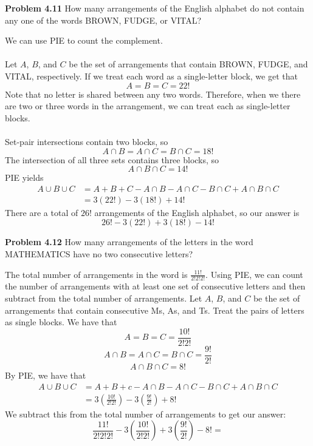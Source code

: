 \documentclass[11pt]{scrartcl}
\begin{document}
\noindent 
\begin{tcolorbox}
\textbf{Problem 4.11} How many arrangements of the English alphabet do not contain any one of the words BROWN, FUDGE, or VITAL?
\end{tcolorbox}
\noindent 
We can use PIE to count the complement. \\
\\
\noindent
Let $A$, $B$, and $C$ be the set of arrangements that contain BROWN, FUDGE, and VITAL, respectively. If we treat each word as a single-letter block, we get that 
$$A=B=C=22!$$
\noindent 
Note that no letter is shared between any two words. Therefore, when we there are two or three words in the arrangement, we can treat each as single-letter blocks. \\
\\
\noindent
Set-pair intersections contain two blocks, so 
$${A \cap B}={A \cap C}={B \cap C}=18!$$
The intersection of all three sets contains three blocks, so
$${A \cap B \cap C}=14!$$
\noindent 
PIE yields 
\begin{align*}
    {A \cup B \cup C} &={A}+{B}+{C}-{A \cap B}-{A \cap C}-{B \cap C}+{A \cap B \cap C} \\
                      &=3(22!)-3(18!)+14!
\end{align*}
\noindent 
There are a total of $26!$ arrangements of the English alphabet, so our answer is 
$$26!-3(22!)+3(18!)-14!$$
\begin{tcolorbox}
\textbf{Problem 4.12} How many arrangements of the letters in the word MATHEMATICS have no two consecutive letters? 
\end{tcolorbox}
\noindent 
The total number of arrangements in the word is $\frac{11!}{2!2!2!}$. Using PIE, we can count the number of arrangements with at least one set of consecutive letters and then subtract from the total number of arrangements. Let $A$, $B$, and $C$ be the set of arrangements that contain consecutive Ms, As, and Ts. Treat the pairs of letters as single blocks. We have that 
$$A=B=C=\frac{10!}{2!2!}$$
$${A \cap B}={A \cap C}={B \cap C}={\frac{9!}{2!}}$$
$${A \cap B \cap C}=8!$$
By PIE, we have that 
\begin{align*}
    {A \cup B \cup C} &={A}+{B}+{c}-{A \cap B}-{A \cap C}-{B \cap C}+{A \cap B \cap C} \\
                      &=3(\frac{10!}{2!2!})-3(\frac{9!}{2!})+8!
\end{align*}
We subtract this from the total number of arrangements to get our answer: 
$$\frac{11!}{2!2!2!}-3(\frac{10!}{2!2!})+3(\frac{9!}{2!})-8!=$$
\end{document}
